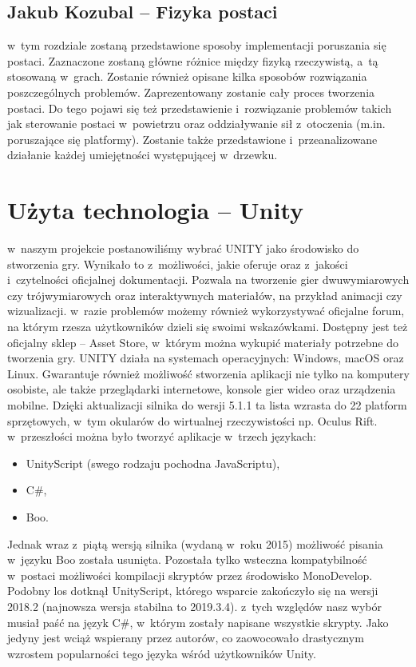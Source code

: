 \documentclass[oneside,polski,logo]{amuthesis}
\begin{document}
\subsection{Jakub Kozubal – Fizyka postaci}
w~tym rozdziale zostaną przedstawione sposoby implementacji poruszania się postaci. Zaznaczone zostaną główne różnice między fizyką rzeczywistą, a~tą stosowaną w~grach. Zostanie również opisane kilka sposobów rozwiązania poszczególnych problemów. Zaprezentowany zostanie cały proces tworzenia postaci. Do tego pojawi się też przedstawienie i~rozwiązanie problemów takich jak sterowanie postaci w~powietrzu oraz oddziaływanie sił z~otoczenia (m.in. poruszające się platformy). Zostanie także przedstawione i~przeanalizowane działanie każdej umiejętności występującej w~drzewku.

\section{Użyta technologia – Unity}
w~naszym projekcie postanowiliśmy wybrać UNITY jako środowisko do stworzenia gry. Wynikało to z~możliwości, jakie oferuje oraz z~jakości i~czytelności oficjalnej dokumentacji. Pozwala na tworzenie gier dwuwymiarowych czy trójwymiarowych oraz interaktywnych materiałów, na przykład animacji czy wizualizacji. w~razie problemów możemy również wykorzystywać oficjalne forum, na którym rzesza użytkowników dzieli się swoimi wskazówkami. Dostępny jest też oficjalny sklep – Asset Store, w~którym można wykupić materiały potrzebne do tworzenia gry. UNITY działa na systemach operacyjnych: Windows, macOS oraz Linux. Gwarantuje również możliwość stworzenia aplikacji nie tylko na komputery osobiste, ale także przeglądarki internetowe, konsole gier wideo oraz urządzenia mobilne. Dzięki aktualizacji silnika do wersji 5.1.1 ta lista wzrasta do 22 platform sprzętowych, w~tym okularów do wirtualnej rzeczywistości np. Oculus Rift.
w~przeszłości można było tworzyć aplikacje w~trzech językach:
\begin{itemize}
\item UnityScript (swego rodzaju pochodna JavaScriptu),
\item C\#,
\item Boo.
\end{itemize}
Jednak wraz z~piątą wersją silnika (wydaną w~roku 2015) możliwość pisania w~języku Boo została usunięta. Pozostała tylko wsteczna kompatybilność w~postaci możliwości kompilacji skryptów przez środowisko MonoDevelop. Podobny los dotknął UnityScript, którego wsparcie zakończyło się na wersji 2018.2 (najnowsza wersja stabilna to 2019.3.4). z~tych względów nasz wybór musiał paść na język C\#, w~którym zostały napisane wszystkie skrypty. Jako jedyny jest wciąż wspierany przez autorów, co zaowocowało drastycznym wzrostem popularności tego języka wśród użytkowników Unity. \cite{unity}
\end{document}
